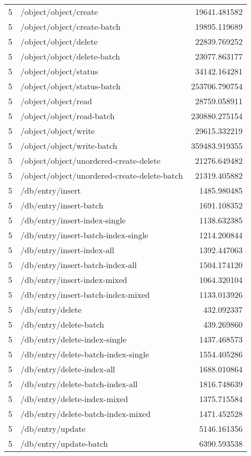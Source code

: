 \begin{longtable}{rlr}
5 & /object/object/create & 19641.481582 \\
5 & /object/object/create-batch & 19895.119689 \\
5 & /object/object/delete & 22839.769252 \\
5 & /object/object/delete-batch & 23077.863177 \\
5 & /object/object/status & 34142.164281 \\
5 & /object/object/status-batch & 253706.790754 \\
5 & /object/object/read & 28759.058911 \\
5 & /object/object/read-batch & 230880.275154 \\
5 & /object/object/write & 29615.332219 \\
5 & /object/object/write-batch & 359483.919355 \\
5 & /object/object/unordered-create-delete & 21276.649482 \\
5 & /object/object/unordered-create-delete-batch & 21319.405882 \\
5 & /db/entry/insert & 1485.980485 \\
5 & /db/entry/insert-batch & 1691.108352 \\
5 & /db/entry/insert-index-single & 1138.632385 \\
5 & /db/entry/insert-batch-index-single & 1214.200844 \\
5 & /db/entry/insert-index-all & 1392.447063 \\
5 & /db/entry/insert-batch-index-all & 1504.174120 \\
5 & /db/entry/insert-index-mixed & 1064.320104 \\
5 & /db/entry/insert-batch-index-mixed & 1133.013926 \\
5 & /db/entry/delete & 432.092337 \\
5 & /db/entry/delete-batch & 439.269860 \\
5 & /db/entry/delete-index-single & 1437.468573 \\
5 & /db/entry/delete-batch-index-single & 1554.405286 \\
5 & /db/entry/delete-index-all & 1688.010864 \\
5 & /db/entry/delete-batch-index-all & 1816.748639 \\
5 & /db/entry/delete-index-mixed & 1375.715584 \\
5 & /db/entry/delete-batch-index-mixed & 1471.452528 \\
5 & /db/entry/update & 5146.161356 \\
5 & /db/entry/update-batch & 6390.593538 \\

\end{longtable}
